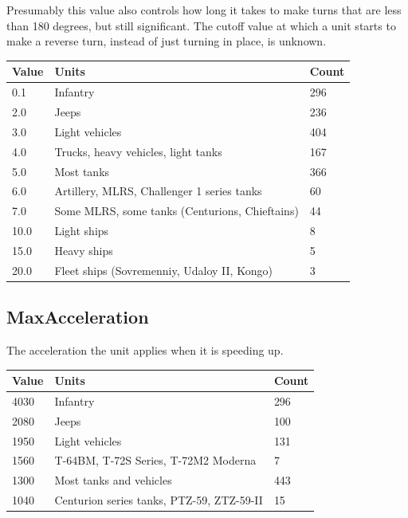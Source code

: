 \documentclass{article}
\begin{document}
Presumably this value also controls how long it takes to make turns that are less than 180 degrees, but still significant. The cutoff value at which a unit starts to make a reverse turn, instead of just turning in place, is unknown.

\begin{center}
    \begin{tabular}{ | l | l | l |}
    \hline
	Value & Units & Count\\ \hline
	0.1 & Infantry & 296\\
	2.0 & Jeeps & 236\\
	3.0 & Light vehicles & 404\\
	4.0 & Trucks, heavy vehicles, light tanks & 167\\
	5.0 & Most tanks & 366\\
	6.0 & Artillery, MLRS, Challenger 1 series tanks & 60\\
	7.0 & Some MLRS, some tanks (Centurions, Chieftains) & 44\\
	10.0 & Light ships & 8\\
	15.0 & Heavy ships & 5\\
	20.0 & Fleet ships (Sovremenniy, Udaloy II, Kongo) & 3\\
    \hline
    \end{tabular}
\end{center}

\subsection{MaxAcceleration}

The acceleration the unit applies when it is speeding up.

\begin{center}
    \begin{tabular}{ | l | l | l |}
    \hline
	Value & Units & Count\\ \hline
	4030 & Infantry & 296\\
	2080 & Jeeps & 100\\
	1950 & Light vehicles & 131\\
	1560 & T-64BM, T-72S Series, T-72M2 Moderna & 7\\
	1300 & Most tanks and vehicles & 443\\
	1040 & Centurion series tanks, PTZ-59, ZTZ-59-II & 15\\
    \hline
    \end{tabular}
\end{center}
\end{document}
